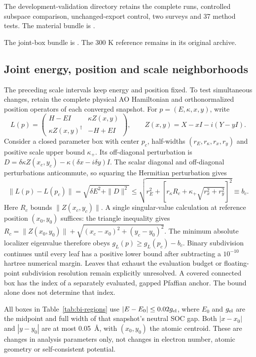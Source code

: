 \documentclass[11pt]{article}
\begin{document}
The development-validation directory retains the complete runs,
controlled subspace comparison, unchanged-export control, two
surveys and 37 method tests. The material bundle is
.

The joint-box bundle is .
The 300 K reference remains in its original archive.

\subsection{Joint energy, position and scale neighborhoods}
\label{sec:si-bismuth-regions}
The preceding scale intervals keep energy and position fixed.
To test simultaneous changes, retain the complete physical AO
Hamiltonian and orthonormalized position operators of each converged
snapshot. For $p=(E,\kappa,x,y)$, write
\begin{equation}
 L(p)=\begin{pmatrix}
 H-EI & \kappa Z(x,y)\\
 \kappa Z(x,y)^\dagger & -H+EI
 \end{pmatrix},\qquad
 Z(x,y)=X-xI-i(Y-yI).
\end{equation}
Consider a closed parameter box with center $p_c$, half-widths
$(r_E,r_\kappa,r_x,r_y)$ and positive scale upper bound
$\kappa_+$. Its off-diagonal perturbation is
$D=\delta\kappa Z(x_c,y_c)-\kappa(\delta x-i\delta y)I$.
The scalar diagonal and off-diagonal perturbations anticommute,
so squaring the Hermitian perturbation gives
\begin{equation}
 \|L(p)-L(p_c)\|
 =\sqrt{\delta E^2+\|D\|^2}
 \leq\sqrt{r_E^2+
 \left[r_\kappa R_c+\kappa_+\sqrt{r_x^2+r_y^2}\right]^2}
 \equiv b_c .
\end{equation}
Here $R_c$ bounds $\|Z(x_c,y_c)\|$. A single singular-value
calculation at reference position $(x_0,y_0)$ suffices: the
triangle inequality gives
$R_c=\|Z(x_0,y_0)\|+
\sqrt{(x_c-x_0)^2+(y_c-y_0)^2}$.
The minimum absolute localizer eigenvalue therefore obeys
$g_L(p)\geq g_L(p_c)-b_c$. Binary subdivision continues until
every leaf has a positive lower bound after subtracting a
$10^{-10}$ hartree numerical margin. Leaves that exhaust the
evaluation budget or floating-point subdivision resolution remain
explicitly unresolved. A covered connected box has the index of
a separately evaluated, gapped Pfaffian anchor. The bound alone
does not determine that index.

All boxes in Table~\ref{tab:bi-regions} use
$|E-E_0|\leq0.02g_{\rm el}$, where $E_0$ and $g_{\rm el}$ are
the midpoint and full width of that snapshot's neutral SOC gap.
Both $|x-x_0|$ and $|y-y_0|$ are at most 0.05~\AA{}, with
$(x_0,y_0)$ the atomic centroid. These are changes in analysis
parameters only, not changes in electron number, atomic geometry
or self-consistent potential.
\end{document}
